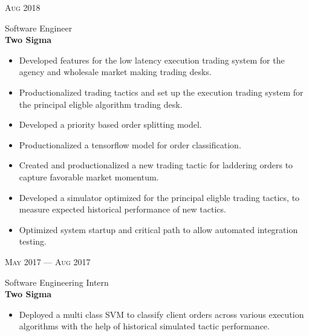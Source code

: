 \documentclass[10pt]{article} %
\begin{document}
{\begin{minipage}[t]{0.5\textwidth}

{\raggedleft\color{headings}\textsc{Aug 2018}\par}
{\raggedright\large Software Engineer
\\
\textbf{Two Sigma}\\[5pt]}

\normalsize
\begin{itemize}
  \item Developed features for the low latency execution trading system for the agency and wholesale market making trading desks.
  \item Productionalized trading tactics and set up the execution trading system for the principal eligble algorithm trading desk.
  \item Developed a priority based order splitting model. 
  \item Productionalized a tensorflow model for order classification.
  \item Created and productionalized a new trading tactic for laddering orders to capture favorable market momentum.
  \item Developed a simulator optimized for the principal eligble trading tactics, to measure expected historical performance of new tactics.
  \item Optimized system startup and critical path to allow automated integration testing.
\end{itemize}


{\raggedleft\color{headings}\textsc{May 2017 --- Aug 2017}\par}
{\raggedright\large Software Engineering Intern
\\
\textbf{Two Sigma}\\[5pt]}

\normalsize
\begin{itemize}
  \item Deployed a multi class SVM to classify client orders across various execution algorithms with the help of historical simulated tactic performance.
\end{itemize}



\end{minipage}}
\end{document}
